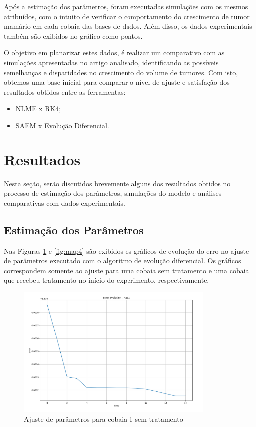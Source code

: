 \documentclass[12pt]{article}
\begin{document}
Após a estimação dos parâmetros, foram executadas simulações com os mesmos atribuídos, com o intuito de verificar o comportamento do crescimento de tumor mamário em cada cobaia das bases de dados. Além disso, os dados experimentais também são exibidos no gráfico como pontos.

O objetivo em planarizar estes dados, é realizar um comparativo com as simulações apresentadas no artigo analisado, identificando as possíveis semelhanças e disparidades no crescimento do volume de tumores. Com isto, obtemos uma base inicial para comparar o nível de ajuste e satisfação dos resultados obtidos entre as ferramentas:

\begin{itemize}
    \setlength{\itemsep}{10pt}
    \item NLME x RK4\footnotemark;
    \item SAEM x Evolução Diferencial.
\end{itemize}


\section{Resultados} \label{sec:4}

Nesta seção, serão discutidos brevemente alguns dos resultados obtidos no processo de estimação dos parâmetros, simulações do modelo e análises comparativas com dados experimentais.

\subsection{Estimação dos Parâmetros}

Nas Figuras \ref{fig:map3} e \ref{fig:map4} são exibidos os gráficos de evolução do erro no ajuste de parâmetros executado com o algoritmo de evolução diferencial. Os gráficos correspondem somente ao ajuste para uma cobaia sem tratamento e uma cobaia que recebeu tratamento no início do experimento, respectivamente.

\begin{figure}[H]
    \centering
    \includegraphics[width=0.85\textwidth]{pic/error_no.png}
    \caption{Ajuste de parâmetros para cobaia 1 sem tratamento}
    \label{fig:map3}
\end{figure}
\end{document}
